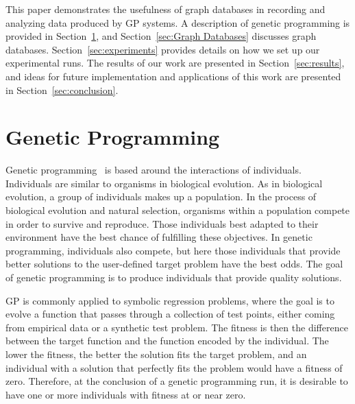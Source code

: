 \documentclass[12pt]{article}
\begin{document}
This paper demonstrates the usefulness of graph databases in recording and analyzing data produced by GP systems. A description of genetic programming is provided in Section~\ref{Genetic Programming}, and Section~\ref{sec:Graph Databases} discusses graph databases. Section~\ref{sec:experiments} provides details on how we set up our experimental runs. The results of our work are presented in Section~\ref{sec:results}, and ideas for future implementation and applications of this work are presented in Section~\ref{sec:conclusion}.

\section{Genetic Programming} \label{Genetic Programming}

Genetic programming~\cite{poli08:fieldguide} is based around the interactions of individuals. Individuals are similar to organisms in biological evolution. As in biological evolution, a group of individuals makes up a population. In the process of biological evolution and natural selection, organisms within a population compete in order to survive and reproduce. Those individuals best adapted to their environment have the best chance of fulfilling these objectives.  In genetic programming, individuals also compete, but here those individuals that provide better solutions to the user-defined target problem have the best odds. The goal of genetic programming is to produce individuals that provide quality solutions.

GP is commonly applied to symbolic regression problems, where the goal is to evolve a function that passes through a collection of test points, either coming from empirical data or a synthetic test problem. The fitness is then the difference between the target function and the function encoded by the individual. The lower the fitness, the better the solution fits the target problem, and an individual with a solution that perfectly fits the problem would have a fitness of zero. Therefore, at the conclusion of a genetic programming run, it is desirable to have one or more individuals with fitness at or near zero.
\end{document}
